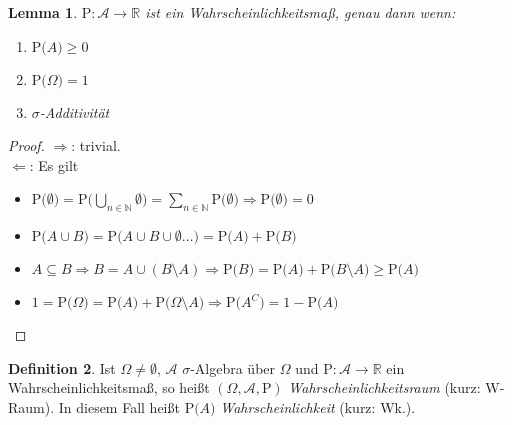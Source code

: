 \documentclass[a4paper,12pt,fleqn]{scrartcl}
\newcommand{\N}{\mathbb{N}}
\newcommand{\R}{\mathbb{R}}
\newcommand{\m}[1]{\mathcal{ #1 }}
\newcommand{\p}[1]{\text{P(} #1 \text{)}}
\newcommand{\WM}{Wahrscheinlichkeitsmaß}
\newcommand{\impl}{\Rightarrow}
\theoremstyle{definition}
\newtheorem{definition}{Definition}[section]
\theoremstyle{plain}
\newtheorem{lemma}[definition]{Lemma}
\theoremstyle{remark}
\begin{document}
\begin{lemma}
$\text{P}:\m{A}\to\R$ ist ein \WM, genau dann wenn:
\begin{enumerate}
\item $\p{A}\geq 0$
\item $\p{\Omega}=1$
\item $\sigma$-Additivität
\end{enumerate}
\end{lemma}
\begin{proof}
\grqq $\impl$\grqq: trivial. \\
\grqq $\Leftarrow$\grqq: Es gilt
\begin{itemize}
\item $\p{\emptyset}=\p{\bigcup_{n\in\N}\emptyset}=\sum_{n\in\N}\p{\emptyset}\impl\p{\emptyset}=0$
\item $\p{ A\cup B}=\p{ A\cup B\cup\emptyset\ldots}=\p{ A}+\p{ B}$
\item $A\subseteq B\impl B=A\cup (B\setminus A)\impl\p{ B}=\p{A}+\p{B\setminus A}\geq\p{A}$
\item $1=\p{\Omega}=\p{A}+\p{\Omega\setminus A}\impl\p{A^C}=1-\p{A}$
\end{itemize}
\end{proof}
\begin{definition}
Ist $\Omega\neq\emptyset$, $\m{A}$ $\sigma$-Algebra über $\Omega$ und $\text{P}:\m{A}\to\R$ ein \WM, so heißt $(\Omega,\m{A},\text{P})$ \emph{Wahrscheinlichkeitsraum} (kurz: W-Raum). In diesem Fall heißt $\p{A}$ \emph{Wahrscheinlichkeit} (kurz: Wk.).
\end{definition}
\end{document}
